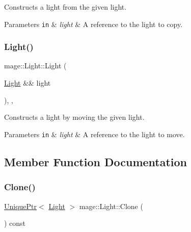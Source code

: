 Constructs a light from the given light.


\begin{DoxyParams}[1]{Parameters}
\mbox{\tt in}  & {\em light} & A reference to the light to copy. \\
\hline
\end{DoxyParams}
\hypertarget{classmage_1_1_light_a311871137a12ac2c27cdb2d4a2d525b7}{}\label{classmage_1_1_light_a311871137a12ac2c27cdb2d4a2d525b7} 
\subsubsection{\texorpdfstring{Light()}{Light()}\hspace{0.1cm}{\footnotesize\ttfamily [3/3]}}
{\footnotesize\ttfamily mage\+::\+Light\+::\+Light (\begin{DoxyParamCaption}\item[{\hyperlink{classmage_1_1_light}{Light} \&\&}]{light }\end{DoxyParamCaption})\hspace{0.3cm}{\ttfamily [protected]}, {\ttfamily [default]}, {\ttfamily [noexcept]}}

Constructs a light by moving the given light.


\begin{DoxyParams}[1]{Parameters}
\mbox{\tt in}  & {\em light} & A reference to the light to move. \\
\hline
\end{DoxyParams}


\subsection{Member Function Documentation}
\hypertarget{classmage_1_1_light_a4c87e4a361b20519c49b4a0397625a6a}{}\label{classmage_1_1_light_a4c87e4a361b20519c49b4a0397625a6a} 
\subsubsection{\texorpdfstring{Clone()}{Clone()}}
{\footnotesize\ttfamily \hyperlink{namespacemage_a3316d7143a973e37adf1110f2e80ca31}{Unique\+Ptr}$<$ \hyperlink{classmage_1_1_light}{Light} $>$ mage\+::\+Light\+::\+Clone (\begin{DoxyParamCaption}{ }\end{DoxyParamCaption}) const}


